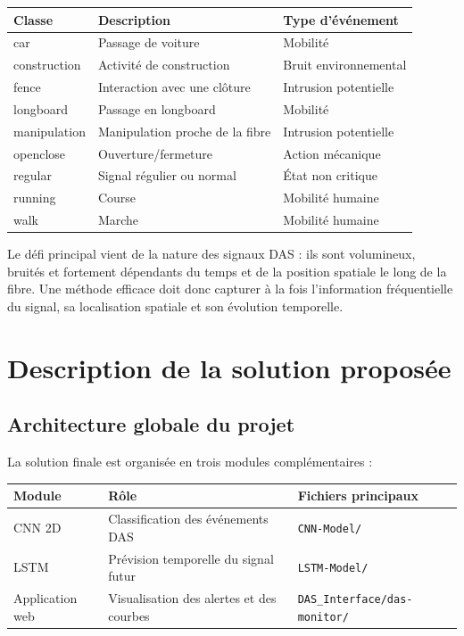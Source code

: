 \documentclass[10pt,a4paper]{article}
\begin{document}
\begin{center}
\begin{tabular}{lll}
\toprule
\textbf{Classe} & \textbf{Description} & \textbf{Type d'événement} \\
\midrule
car & Passage de voiture & Mobilité \\
construction & Activité de construction & Bruit environnemental \\
fence & Interaction avec une clôture & Intrusion potentielle \\
longboard & Passage en longboard & Mobilité \\
manipulation & Manipulation proche de la fibre & Intrusion potentielle \\
openclose & Ouverture/fermeture & Action mécanique \\
regular & Signal régulier ou normal & État non critique \\
running & Course & Mobilité humaine \\
walk & Marche & Mobilité humaine \\
\bottomrule
\end{tabular}
\end{center}

Le défi principal vient de la nature des signaux DAS : ils sont volumineux, bruités et fortement dépendants
du temps et de la position spatiale le long de la fibre. Une méthode efficace doit donc capturer à la fois
l'information fréquentielle du signal, sa localisation spatiale et son évolution temporelle.

\section{Description de la solution proposée}

\subsection{Architecture globale du projet}

La solution finale est organisée en trois modules complémentaires :

\begin{center}
\begin{tabular}{lll}
\toprule
\textbf{Module} & \textbf{Rôle} & \textbf{Fichiers principaux} \\
\midrule
CNN 2D & Classification des événements DAS & \texttt{CNN-Model/} \\
LSTM & Prévision temporelle du signal futur & \texttt{LSTM-Model/} \\
Application web & Visualisation des alertes et des courbes & \texttt{DAS\_Interface/das-monitor/} \\
\bottomrule
\end{tabular}
\end{center}
\end{document}
